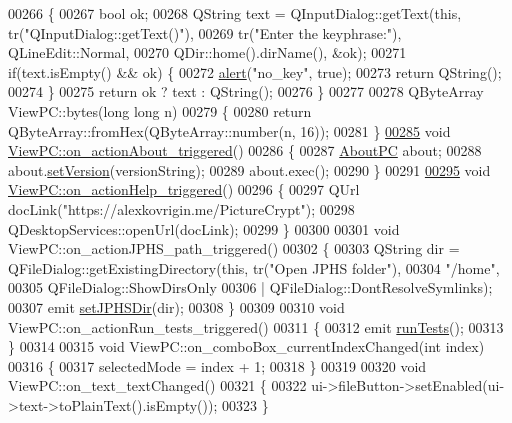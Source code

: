 \begin{DoxyCode}
00266 \{
00267     \textcolor{keywordtype}{bool} ok;
00268     QString text = QInputDialog::getText(\textcolor{keyword}{this}, tr(\textcolor{stringliteral}{"QInputDialog::getText()"}),
00269                                          tr(\textcolor{stringliteral}{"Enter the keyphrase:"}), QLineEdit::Normal,
00270                                          QDir::home().dirName(), &ok);
00271     \textcolor{keywordflow}{if}(text.isEmpty() && ok) \{
00272         \hyperlink{class_view_p_c_a7c467169467789561078abc9d4fe57bd}{alert}(\textcolor{stringliteral}{"no\_key"}, \textcolor{keyword}{true});
00273         \textcolor{keywordflow}{return} QString();
00274     \}
00275     \textcolor{keywordflow}{return} ok ? text : QString();
00276 \}
00277 
00278 QByteArray ViewPC::bytes(\textcolor{keywordtype}{long} \textcolor{keywordtype}{long} n)
00279 \{
00280     \textcolor{keywordflow}{return} QByteArray::fromHex(QByteArray::number(n, 16));
00281 \}
\hypertarget{viewpc_8cpp_source_l00285}{}\hyperlink{class_view_p_c_a09a46da4d492eb3dde88f35dc58c997b}{00285} \textcolor{keywordtype}{void} \hyperlink{class_view_p_c_a09a46da4d492eb3dde88f35dc58c997b}{ViewPC::on\_actionAbout\_triggered}()
00286 \{
00287     \hyperlink{class_about_p_c}{AboutPC} about;
00288     about.\hyperlink{class_about_p_c_aa3815d4826d0c8d87122449537a0a4d5}{setVersion}(versionString);
00289     about.exec();
00290 \}
00291 
\hypertarget{viewpc_8cpp_source_l00295}{}\hyperlink{class_view_p_c_a0d252ff4829260c6c76769fbd24b7cd7}{00295} \textcolor{keywordtype}{void} \hyperlink{class_view_p_c_a0d252ff4829260c6c76769fbd24b7cd7}{ViewPC::on\_actionHelp\_triggered}()
00296 \{
00297     QUrl docLink(\textcolor{stringliteral}{"https://alexkovrigin.me/PictureCrypt"});
00298     QDesktopServices::openUrl(docLink);
00299 \}
00300 
00301 \textcolor{keywordtype}{void} ViewPC::on\_actionJPHS\_path\_triggered()
00302 \{
00303     QString dir = QFileDialog::getExistingDirectory(\textcolor{keyword}{this}, tr(\textcolor{stringliteral}{"Open JPHS folder"}),
00304                                                     \textcolor{stringliteral}{"/home"},
00305                                                     QFileDialog::ShowDirsOnly
00306                                                     | QFileDialog::DontResolveSymlinks);
00307     emit \hyperlink{class_view_p_c_ae81085836c0c01bc9556a5b27eb8d19c}{setJPHSDir}(dir);
00308 \}
00309 
00310 \textcolor{keywordtype}{void} ViewPC::on\_actionRun\_tests\_triggered()
00311 \{
00312     emit \hyperlink{class_view_p_c_a96a6c95728bf20c64d2a8fe978495395}{runTests}();
00313 \}
00314 
00315 \textcolor{keywordtype}{void} ViewPC::on\_comboBox\_currentIndexChanged(\textcolor{keywordtype}{int} index)
00316 \{
00317     selectedMode = index + 1;
00318 \}
00319 
00320 \textcolor{keywordtype}{void} ViewPC::on\_text\_textChanged()
00321 \{
00322     ui->fileButton->setEnabled(ui->text->toPlainText().isEmpty());
00323 \}
\end{DoxyCode}
